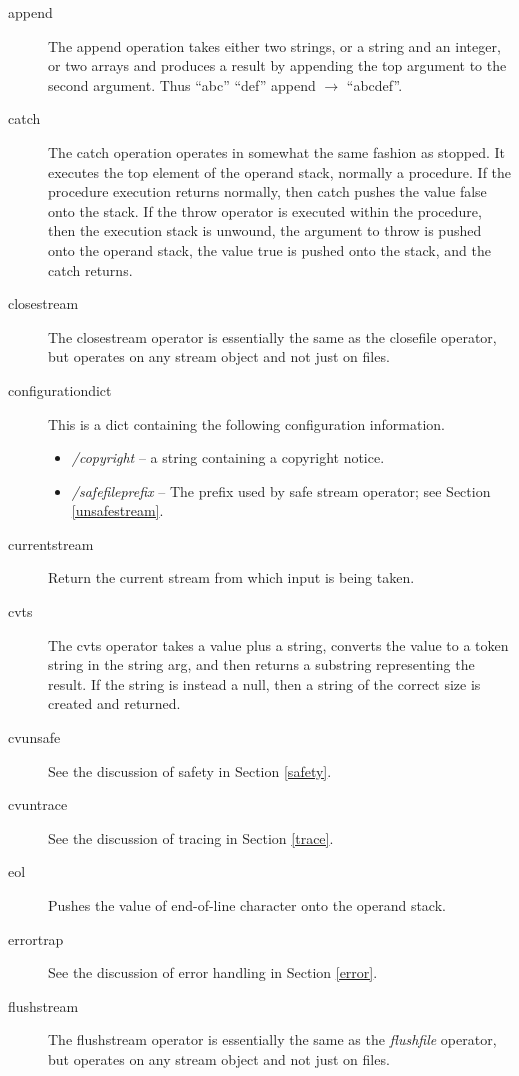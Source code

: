\begin{description}
\item[append]
The append operation takes either two strings, or a string and an integer,
or two arrays
and produces a result by appending the top argument to the second
argument.  Thus ``abc'' ``def'' append $\rightarrow$ ``abcdef''.
\item[catch]
The catch operation operates in somewhat the same fashion as stopped.
It executes the top element of the operand stack, normally a procedure.
If the procedure execution returns normally, then catch pushes the value false
onto the stack.  If the throw operator is executed within the procedure,
then
the execution stack is unwound,
the argument to throw is pushed onto the operand stack,
the value true is pushed onto the stack,
and the catch returns.
\item[closestream]
The closestream operator is essentially the same as the closefile operator,
but operates on any stream object and not just on files.
\item[configurationdict]
This is a dict containing the following configuration information.
    \begin{itemize}
	\item {\em /copyright} -- a string containing a copyright notice.
	\item {\em /safefileprefix} -- The prefix used by safe
		stream operator; see Section \ref{unsafestream}.
    \end{itemize}
\item[currentstream]
Return the current stream from which input is being taken.
\item[cvts]
The cvts operator takes a value plus a string, converts the value
to a token string in the string arg, and then returns a substring
representing the result.  If the string is instead a null, then
a string of the correct size is created and returned.
\item[cvunsafe]
See the discussion of safety in Section \ref{safety}.
\item[cvuntrace]
See the discussion of tracing in Section \ref{trace}.
\item[eol]
Pushes the value of end-of-line character onto the operand stack.
\item[errortrap]
See the discussion of error handling in Section \ref{error}.
\item[flushstream]
The flushstream operator is essentially the same as the {\em flushfile}
operator, but operates on any stream object and not just on files.

\end{description}
